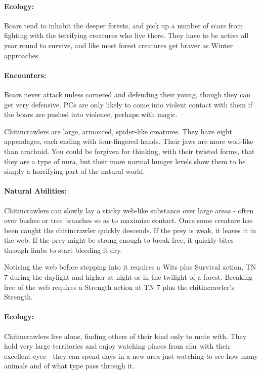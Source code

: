 \begin{multicols}{2}
\label{boar}
\boar

\paragraph{Ecology:} Boars tend to inhabit the deeper forests, and pick up a number of scars from fighting with the terrifying creatures who live there.
They have to be active all year round to survive, and like most forest creatures get braver as Winter approaches.

\paragraph{Encounters:} Boars never attack unless cornered and defending their young, though they can get very defensive.  PCs are only likely to come into violent contact with them if the boars are pushed into violence, perhaps with magic.

\label{chitincrawler}

Chitincrawlers are large, armoured, spider-like creatures.
They have eight appendages, each ending with four-fingered hands.
Their jaws are more wolf-like than arachnid.
You could be forgiven for thinking, with their twisted forms, that they are a type of nura, but their more normal hunger levels show them to be simply a horrifying part of the natural world.

\chitincrawler

\paragraph{Natural Abilities:} Chitincrawlers can slowly lay a sticky web-like substance over large areas - often over bushes or tree branches so as to maximize contact.  Once some creature has been caught the chitincrawler quickly descends.  If the prey is weak, it leaves it in the web.  If the prey might be strong enough to break free, it quickly bites through limbs to start bleeding it dry.

Noticing the web before stepping into it requires a Wits plus Survival action, TN 7 during the daylight and higher at night or in the twilight of a forest.
Breaking free of the web requires a Strength action at TN 7 plus the chitincrawler's Strength.

\paragraph{Ecology:} Chitincrawlers live alone, finding others of their kind only to mate with.  They hold very large territories and enjoy watching places from afar with their excellent eyes - they can spend days in a new area just watching to see how many animals and of what type pass through it.


\end{multicols}
